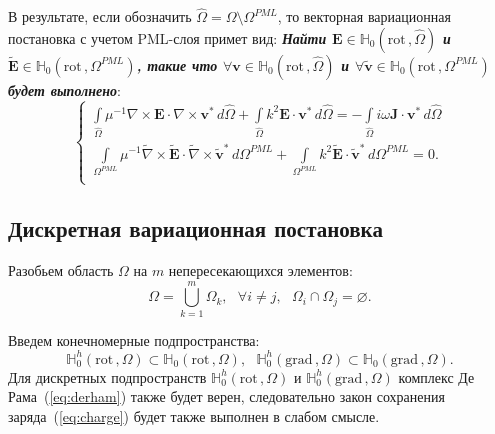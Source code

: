 \documentclass[a4paper,14pt]{article}
\begin{document}
В результате, если обозначить $\widehat{\Omega} = \Omega \setminus {\Omega^{PML}}$, то векторная вариационная постановка с учетом PML-слоя примет вид: \textbf{\textit{Найти $\mathbf{E} \in \mathbb{H}_{0}( \mathrm{rot}\,, \widehat{\Omega} )$ и  $\tilde{\mathbf{E}} \in \mathbb{H}_{0}( \mathrm{rot}\,, {\Omega^{PML}} )$, такие что $\forall \mathbf{v} \in \mathbb{H}_{0}( \mathrm{rot}\,, \widehat{\Omega} )$ и $\forall \tilde{\mathbf{v}} \in \mathbb{H}_{0}( \mathrm{rot}\,, {\Omega^{PML}} )$ будет выполнено}}:
\begin{equation*}
	\begin{cases}
		\displaystyle
		\int\limits_{\widehat{\Omega}} \mu^{-1} \nabla \times \mathbf{E} \cdot \nabla \times \mathbf{v}^{*} \,d\widehat{\Omega} + \int\limits_{\widehat{\Omega}} k^{2} \mathbf{E} \cdot \mathbf{v}^{*} \,d\widehat{\Omega} = - \int\limits_{\widehat{\Omega}} i \omega \mathbf{J} \cdot \mathbf{v}^{*} \,d\widehat{\Omega} \\
		\displaystyle
		\int\limits_{{\Omega^{PML}}} \mu^{-1} \tilde{\nabla} \times \tilde{\mathbf{E}} \cdot \tilde{\nabla} \times \tilde{\mathbf{v}}^{*} \,d{\Omega^{PML}} + \int\limits_{{\Omega^{PML}}} k^{2} \tilde{\mathbf{E}} \cdot \tilde{\mathbf{v}}^{*} \,d{\Omega^{PML}} = 0 . \\
	\end{cases}
\end{equation*}


\subsection{Дискретная вариационная постановка}
Разобьем область $\Omega$ на $m$ непересекающихся элементов:
\begin{equation*}
	\Omega = \bigcup\limits_{k=1}^{m} \Omega_k , \text{~~} \forall i \neq j , \text{~~} \Omega_i \cap \Omega_j = \varnothing .
\end{equation*}

Введем конечномерные подпространства:
\begin{equation*}
	\mathbb{H}_{0}^h( \mathrm{rot}\,, \Omega ) \subset \mathbb{H}_{0}( \mathrm{rot}\,, \Omega ) , \text{~~}
	\mathbb{H}_{0}^h( \mathrm{grad}\,, \Omega ) \subset \mathbb{H}_{0}( \mathrm{grad}\,, \Omega ) .
\end{equation*}
Для дискретных подпространств $\mathbb{H}_{0}^h( \mathrm{rot}\,, \Omega )$ и $\mathbb{H}_{0}^h( \mathrm{grad}\,, \Omega )$ комплекс Де Рама~(\ref{eq:derham}) также будет верен, следовательно закон сохранения заряда~(\ref{eq:charge}) будет также выполнен в слабом смысле.
\end{document}

